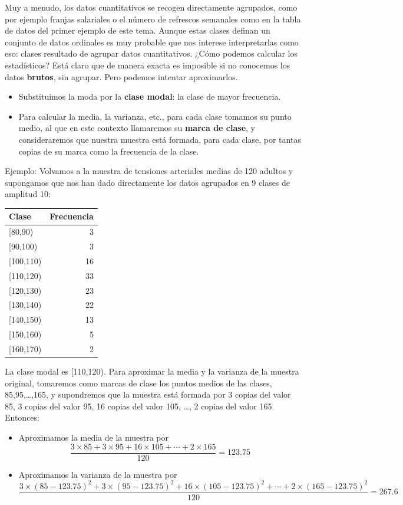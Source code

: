 \documentclass[
  spanish,
  letterpaper,
  DIV=11,
  numbers=noendperiod]{scrreprt}
\providecommand{\tightlist}{%
  \setlength{\itemsep}{0pt}\setlength{\parskip}{0pt}}
\begin{document}
\begin{tcolorbox}
Muy a menudo, los datos cuantitativos se recogen directamente agrupados,
como por ejemplo franjas salariales o el número de refrescos semanales
como en la tabla de datos del primer ejemplo de este tema. Aunque estas
clases definan un conjunto de datos ordinales es muy probable que nos
interese interpretarlas como eso: clases resultado de agrupar datos
cuantitativos. ¿Cómo podemos calcular los estadísticos? Está claro que
de manera exacta es imposible si no conocemos los datos \textbf{brutos},
sin agrupar. Pero podemos intentar aproximarlos.

\begin{itemize}
\tightlist
\item
  Substituimos la moda por la \textbf{clase modal}: la clase de mayor
  frecuencia.
\item
  Para calcular la media, la varianza, etc., para cada clase tomamos su
  punto medio, al que en este contexto llamaremos su \textbf{marca de
  clase}, y consideraremos que nuestra muestra está formada, para cada
  clase, por tantas copias de su marca como la frecuencia de la clase.
\end{itemize}

Ejemplo: Volvamos a la muestra de tensiones arteriales medias de 120
adultos y supongamos que nos han dado directamente los datos agrupados
en 9 clases de amplitud 10:

\begin{longtable*}[t]{lr}
\toprule
Clase & Frecuencia\\
\midrule
{}[80,90) & 3\\
{}[90,100) & 3\\
{}[100,110) & 16\\
{}[110,120) & 33\\
{}[120,130) & 23\\
\addlinespace
{}[130,140) & 22\\
{}[140,150) & 13\\
{}[150,160) & 5\\
{}[160,170) & 2\\
\bottomrule
\end{longtable*}

La clase modal es {[}110,120). Para aproximar la media y la varianza de
la muestra original, tomaremos como marcas de clase los puntos medios de
las clases, 85,95,\ldots,165, y supondremos que la muestra está formada
por 3 copias del valor 85, 3 copias del valor 95, 16 copias del valor
105, \ldots, 2 copias del valor 165. Entonces:

\begin{itemize}
\item
  Aproximamos la media de la muestra por \[
  \frac{3\times 85+3\times 95+16\times 105+\cdots+2\times 165}{120}=123.75
  \]
\item
  Aproximamos la varianza de la muestra por \[
  \frac{3\times (85-123.75)^2+3\times (95-123.75)^2+16\times (105-123.75)^2+\cdots+2\times (165-123.75)^2}{120}=267.6
  \]
\end{itemize}


\end{tcolorbox}
\end{document}
